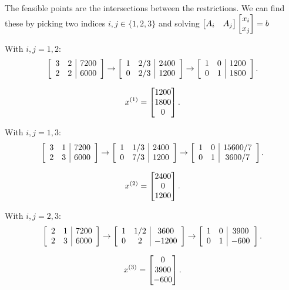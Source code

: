 
The feasible points are the intersections between the restrictions. We can find these by picking two indices $i, j \in \{1, 2, 3\}$ and solving $\M{A_i & A_j}\M{x_i  \\ x_j } = b$

\medskip
\begin{minipage}[c]{0.55\textwidth}
  With $i, j = 1, 2$:
  \[
    \MGJ{cc|c}{3 & 2 & 7200 \\ 2 &  2 & 6000} \rightarrow \MGJ{cc|c}{1 & 2 /3 & 2400 \\ 0 & 2 /3 & 1200} \rightarrow \MGJ{cc|c}{1 & 0 & 1200 \\ 0 & 1 & 1800}
    .\]
\end{minipage}
\begin{minipage}[c]{0.45\textwidth}
  \[
    x^{(1)} = \M{1200 \\ 1800 \\ 0}
    .\]
\end{minipage}

\bigskip
\begin{minipage}[c]{0.55\textwidth}
  With $i, j = 1, 3$:
  \[
    \MGJ{cc|c}{3 & 1 & 7200 \\ 2 & 3 & 6000} \rightarrow \MGJ{cc|c}{1 & 1 / 3 & 2400 \\ 0 & 7 / 3 & 1200} \rightarrow \MGJ{cc|c}{1 & 0 & 15600 / 7 \\ 0 & 1 & 3600 / 7}
    .\]
\end{minipage}
\begin{minipage}[c]{0.45\textwidth}
  \[
    x^{(2)} = \M{2400 \\ 0 \\ 1200}
    .\]
\end{minipage}

\bigskip
\begin{minipage}[c]{0.55\textwidth}
  With $i, j = 2, 3$:
  \[
    \MGJ{cc|c}{2 & 1 & 7200 \\ 2 & 3 & 6000} \rightarrow \MGJ{cc|c}{1 & 1 /2  & 3600 \\ 0 & 2 & -1200} \rightarrow \MGJ{cc|c}{1 & 0 & 3900 \\ 0 & 1 & -600}
    .\]
\end{minipage}
\begin{minipage}[c]{0.45\textwidth}
  \[
    x^{(3)} = \M{0 \\ 3900 \\ -600}
    .\]
\end{minipage}

